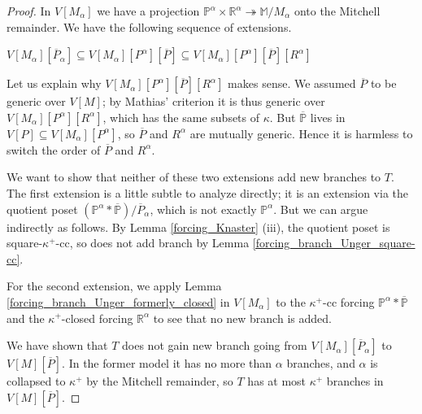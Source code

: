 \documentclass[10pt,reqno]{amsart}
\theoremstyle{plain}
\theoremstyle{definition}
\theoremstyle{remark}
\begin{document}
\begin{proof}
In $V[M_\alpha]$ we have a projection $\mathbb{P}^\alpha\times\mathbb{R}^\alpha\twoheadrightarrow\mathbb{M}/M_\alpha$ onto the Mitchell remainder. We have the following sequence of extensions.

\begin{center}
$V[M_\alpha][\overline{P}_\alpha]\subseteq V[M_\alpha][P^\alpha][\overline{P}]\subseteq V[M_\alpha][P^\alpha][\overline{P}][R^\alpha]$
\end{center}

Let us explain why $V[M_\alpha][P^\alpha][\overline{P}][R^\alpha]$ makes sense. We assumed $\overline{P}$ to be generic over $V[M]$; by Mathias' criterion it is thus generic over $V[M_\alpha][P^\alpha][R^\alpha]$, which has the same subsets of $\kappa$. But $\overline{\mathbb{P}}$ lives in $V[P]\subseteq V[M_\alpha][P^\alpha]$, so $\overline{P}$ and $R^\alpha$ are mutually generic. Hence it is harmless to switch the order of $\overline{P}$ and $R^\alpha$.

We want to show that neither of these two extensions add new branches to $T$. The first extension is a little subtle to analyze directly; it is an extension via the quotient poset $(\mathbb{P}^\alpha*\overline{\mathbb{P}})/\overline{P}_\alpha$, which is not exactly $\mathbb{P}^\alpha$. But we can argue indirectly as follows. By Lemma \ref{forcing_Knaster} (iii), the quotient poset is square-$\kappa^+$-cc, so does not add branch by Lemma \ref{forcing_branch_Unger_square-cc}.

For the second extension, we apply Lemma \ref{forcing_branch_Unger_formerly_closed} in $V[M_\alpha]$ to the $\kappa^+$-cc forcing $\mathbb{P}^\alpha*\mathbb{\overline{P}}$ and the $\kappa^+$-closed forcing $\mathbb{R}^\alpha$ to see that no new branch is added.

We have shown that $T$ does not gain new branch going from $V[M_\alpha][\overline{P}_\alpha]$ to $V[M][\overline{P}]$. In the former model it has no more than $\alpha$ branches, and $\alpha$ is collapsed to $\kappa^+$ by the Mitchell remainder, so $T$ has at most $\kappa^+$ branches in $V[M][\overline{P}]$.
\end{proof}
\end{document}
